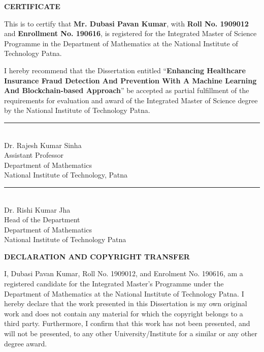 \documentclass[12pt,a4paper,oneside]{report}
\begin{document}
\newpage
\begin{center}
{\Large\bfseries CERTIFICATE}
\end{center}

\vspace{2cm}

This is to certify that \textbf{Mr. Dubasi Pavan Kumar}, with \textbf{Roll No. 1909012} and \textbf{Enrollment No. 190616}, is registered for the Integrated Master of Science Programme in the Department of Mathematics at the National Institute of Technology Patna.

\vspace{1.5cm}

I hereby recommend that the Dissertation entitled ``\textbf{Enhancing Healthcare Insurance Fraud Detection And Prevention With A Machine Learning And Blockchain-based Approach}'' be accepted as partial fulfillment of the requirements for evaluation and award of the Integrated Master of Science degree by the National Institute of Technology Patna.

\vspace{4cm}

\noindent
\begin{minipage}[t]{0.45\textwidth}
\rule{5cm}{0.5pt}\\
Dr. Rajesh Kumar Sinha\\
Assistant Professor\\
Department of Mathematics\\
National Institute of Technology, Patna
\end{minipage}
\hfill
\begin{minipage}[t]{0.45\textwidth}
\raggedleft
\rule{5cm}{0.5pt}\\
Dr. Rishi Kumar Jha\\
Head of the Department\\
Department of Mathematics\\
National Institute of Technology Patna
\end{minipage}

\newpage
\begin{center}
{\Large\bfseries DECLARATION AND COPYRIGHT TRANSFER}
\end{center}

\vspace{1cm}

I, Dubasi Pavan Kumar, Roll No. 1909012, and Enrolment No. 190616, am a registered candidate for the Integrated Master's Programme under the Department of Mathematics at the National Institute of Technology Patna. I hereby declare that the work presented in this Dissertation is my own original work and does not contain any material for which the copyright belongs to a third party. Furthermore, I confirm that this work has not been presented, and will not be presented, to any other University/Institute for a similar or any other degree award.
\end{document}
